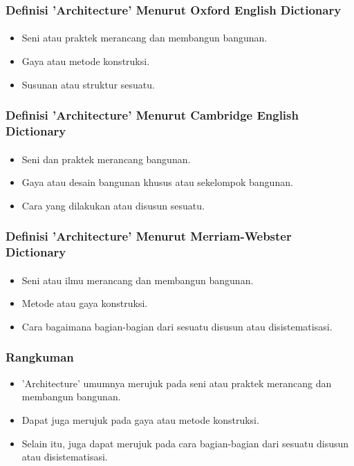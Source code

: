 \documentclass[aspectratio=169, table]{beamer}
\begin{document}
	\begin{frame}
		\frametitle{Definisi 'Architecture' Menurut Oxford English Dictionary}
        \framesubtitle{\hspace{1cm}}
		\begin{itemize}
			\item Seni atau praktek merancang dan membangun bangunan.
			\item Gaya atau metode konstruksi.
			\item Susunan atau struktur sesuatu.
		\end{itemize}
	\end{frame}

	\begin{frame}
		\frametitle{Definisi 'Architecture' Menurut Cambridge English Dictionary}
        \framesubtitle{\hspace{1cm}}
		\begin{itemize}
			\item Seni dan praktek merancang bangunan.
			\item Gaya atau desain bangunan khusus atau sekelompok bangunan.
			\item Cara yang dilakukan atau disusun sesuatu.
		\end{itemize}
	\end{frame}

	\begin{frame}
		\frametitle{Definisi 'Architecture' Menurut Merriam-Webster Dictionary}
        \framesubtitle{\hspace{1cm}}
		\begin{itemize}
			\item Seni atau ilmu merancang dan membangun bangunan.
			\item Metode atau gaya konstruksi.
			\item Cara bagaimana bagian-bagian dari sesuatu disusun atau disistematisasi.
		\end{itemize}
	\end{frame}

	\begin{frame}
		\frametitle{Rangkuman}
		\begin{itemize}
			\item 'Architecture' umumnya merujuk pada seni atau praktek merancang dan membangun bangunan.
			\item Dapat juga merujuk pada gaya atau metode konstruksi.
			\item Selain itu, juga dapat merujuk pada cara bagian-bagian dari sesuatu disusun atau disistematisasi.
		\end{itemize}
	\end{frame}
\end{document}
